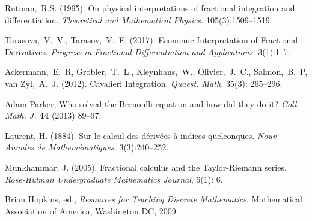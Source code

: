 \documentclass{article}
\theoremstyle{theorem}
\theoremstyle{definition}
\begin{document}
\begin{thebibliography}{1}
 Rutman,~R.S. (1995). On physical interpretations of fractional integration and differentiation. \textit{Theoretical and Mathematical Physics.} 105(3):1509--1519

 Tarasova,~V.~V., Tarasov,~V.~E. (2017). Economic Interpretation of Fractional Derivatives. \textit{Progress in Fractional Differentiation and Applications.} 3(1):1--7. 

 Ackermann,~E.~R, Grobler,~T.~L., Kleynhans,~W., Olivier,~J.~C., Salmon,~B.~P, van Zyl,~A.~J. (2012). Cavalieri
Integration. \textit{Quaest. Math.} 35(3): 265–296.

 Adam Parker, Who solved the Bernoulli equation and how did they do it? \textit{Coll. Math. J.} \textbf{44} (2013) 89--97.

 Laurent, H. (1884). Sur le calcul des d\'{e}riv\'{e}es \`{a} indices quelconques. \textit{Nouv Annales de Mathem\'{e}matiques.} 3(3):240--252. 

 Munkhammar, J. (2005). Fractional calculus and the Taylor-Riemann series. \textit{Rose-Hulman Undergraduate Mathematics Journal}, 6(1): 6.

 Brian Hopkins, ed., \textit{Resources for Teaching Discrete Mathematics}, Mathematical Association of America, Washington DC, 2009.
\end{thebibliography}
\vfill\eject
\end{document}
